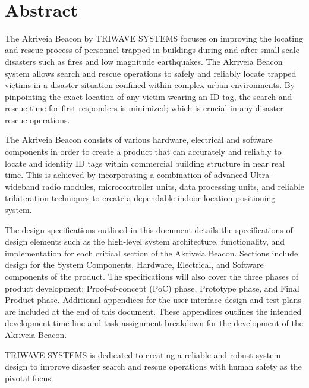 
\
\section*{Abstract}	%

\bigskip
The Akriveia Beacon by TRIWAVE SYSTEMS focuses on improving the locating and rescue process of personnel trapped in buildings during and after small scale disasters such as fires and low magnitude earthquakes. The Akriveia Beacon system allows search and rescue operations to safely and reliably locate trapped victims in a disaster situation confined within complex urban environments. By pinpointing the exact location of any victim wearing an ID tag, the search and rescue time for first responders is minimized; which is crucial in any disaster rescue operations.

\bigskip
The Akriveia Beacon consists of various hardware, electrical and software components in order to create a product that can accurately and reliably to locate and identify ID tags within commercial building structure in near real time. This is achieved by incorporating a combination of advanced Ultra-wideband radio modules, microcontroller units, data processing units, and reliable trilateration techniques to create a dependable indoor location positioning system. 

\bigskip
The design specifications outlined in this document details the specifications of design elements such as the high-level system architecture, functionality, and implementation for each critical section of the Akriveia Beacon. Sections include design for the System Components, Hardware, Electrical, and Software components of the product. The specifications will also cover the three phases of product development: Proof-of-concept (PoC) phase, Prototype phase, and Final Product phase. Additional appendices for the user interface design and test plans are included at the end of this document. These appendices outlines the intended development time line and task assignment breakdown for the development of the Akriveia Beacon.

\bigskip
TRIWAVE SYSTEMS is dedicated to creating a reliable and robust system design to improve disaster search and rescue operations with human safety as the pivotal focus.
